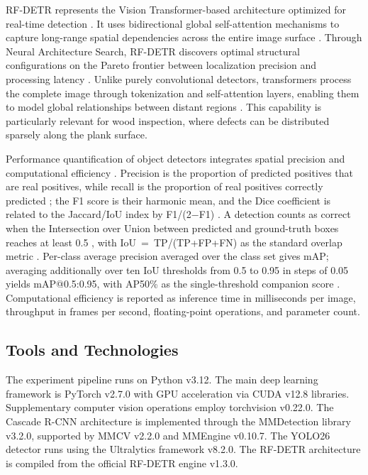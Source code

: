 \documentclass[pdflatex,sn-basic,Numbered,iicol]{sn-jnl}
\begin{document}
RF-DETR represents the Vision Transformer-based architecture optimized for real-time detection \citep{robinson2026rfdetrneuralarchitecturesearch}. It uses bidirectional global self-attention mechanisms to capture long-range spatial dependencies across the entire image surface \citep{zhao2023detrs}. Through Neural Architecture Search, RF-DETR discovers optimal structural configurations on the Pareto frontier between localization precision and processing latency \citep{robinson2026rfdetrneuralarchitecturesearch}. Unlike purely convolutional detectors, transformers process the complete image through tokenization and self-attention layers, enabling them to model global relationships between distant regions \citep{zhao2023detrs}. This capability is particularly relevant for wood inspection, where defects can be distributed sparsely along the plank surface.

Performance quantification of object detectors integrates spatial precision and computational efficiency \citep{Shah2026Review}. Precision is the proportion of predicted positives that are real positives, while recall is the proportion of real positives correctly predicted \citep{powers2011evaluation}; the F1 score is their harmonic mean, and the Dice coefficient is related to the Jaccard/IoU index by F1/(2$-$F1) \citep{powers2011evaluation}. A detection counts as correct when the Intersection over Union between predicted and ground-truth boxes reaches at least 0.5 \citep{lin2014coco}, with IoU~=~TP/(TP+FP+FN) as the standard overlap metric \citep{everingham2010voc,cordts2016cityscapes}. Per-class average precision averaged over the class set gives mAP; averaging additionally over ten IoU thresholds from 0.5 to 0.95 in steps of 0.05 yields mAP@0.5:0.95, with AP50\% as the single-threshold companion score \citep{cordts2016cityscapes}. Computational efficiency is reported as inference time in milliseconds per image, throughput in frames per second, floating-point operations, and parameter count.

\subsection{Tools and Technologies}
\label{sec:tools}

The experiment pipeline runs on Python v3.12. The main deep learning framework is PyTorch v2.7.0 with GPU acceleration via CUDA v12.8 libraries. Supplementary computer vision operations employ torchvision v0.22.0. The Cascade R-CNN architecture is implemented through the MMDetection library v3.2.0, supported by MMCV v2.2.0 and MMEngine v0.10.7. The YOLO26 detector runs using the Ultralytics framework v8.2.0. The RF-DETR architecture is compiled from the official RF-DETR engine v1.3.0.
\end{document}
